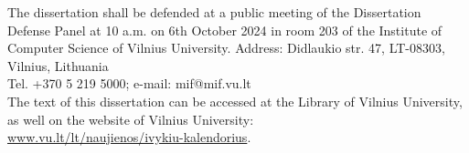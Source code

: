 \begin{singlespace}
\vspace{2cm}

\noindent
The dissertation shall be defended at a public meeting of the Dissertation Defense Panel at 10 a.m. on 6th October 2024 in room 203 of the Institute of Computer Science of Vilnius University. Address: Didlaukio str. 47, LT-08303, Vilnius, Lithuania\\ 
Tel. +370 5 219 5000; e-mail: mif@mif.vu.lt \\

\vspace{1cm}
\noindent
The text of this dissertation can be accessed at the Library of Vilnius
University, as well on the website of Vilnius University:\\ 
\href{ www.vu.lt/lt/naujienos/ivykiu-kalendorius}{ www.vu.lt/lt/naujienos/ivykiu-kalendorius}.

\if{} \thesisTitleEN \else \thesisTitleLT \fi


\end{singlespace}

